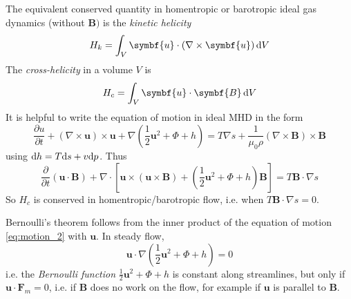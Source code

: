 \documentclass{jknotes}
\newcommand{\B}{\symbf{B}}
\renewcommand{\u}{\symbf{u}}
\begin{document}
The equivalent conserved quantity in homentropic or barotropic ideal gas
dynamics (without $\B)$ is the \emph{kinetic helicity}
\begin{equation}
	H_k = \int_V \u \cdot (\nabla \times \u) \, \diffd V
\end{equation}
The \emph{cross-helicity} in a volume $V$ is
\begin{equation}
	H_c = \int_V \u \cdot \B \, \diffd V
\end{equation}
It is helpful to write the equation of motion in ideal MHD in the form
\begin{equation}
	\frac{\partial u}{\partial t} + (\nabla \times \u) \times \u + \nabla
	(\frac{1}{2}\u^2 + \Phi + h) = T \nabla s + \frac{1}{\mu_0 \rho} (\nabla
	\times \B) \times \B
	\label{eq:motion_2}
\end{equation}
using $\diffd h = T \diffd s + v \diffd p$. Thus
\begin{equation}
	\frac{\partial}{\partial t} (\u \cdot \B) + \nabla \cdot \left[ \u \times
	(\u \times \B) + (\frac{1}{2}\u^2 + \Phi + h)\B \right] = T \B \cdot
	\nabla s
\end{equation}
So $H_c$ is conserved in homentropic/barotropic flow, i.e. when $T \B \cdot
\nabla s = 0 $.

Bernoulli's theorem follows from the inner product of the equation of motion
\eqref{eq:motion_2} with $\u$. In steady flow,
\begin{equation}
	\u \cdot \nabla (\frac{1}{2}\u^2 + \Phi + h) = 0
\end{equation}
i.e. the \emph{Bernoulli function} $\frac{1}{2}\u^2 + \Phi + h$ is constant
along streamlines, but only if $\u \cdot \symbf{F}_m = 0$, i.e. if $\B$ does
no work on the flow, for example if $\u$ is parallel to $\B$.
\end{document}
